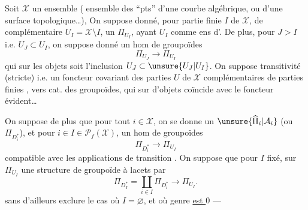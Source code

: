 Soit $\mathcal{X}$ un ensemble \inserted{$\ne\varnothing$}
( ensemble des
``pts'' d'une  courbe algébrique,
ou d'une surface topologique\ldots), 
 On suppose
donné, pour  partie finie $I$ de $\mathcal{X}$,
de complémentaire $U_I=\mathcal{X}\setminus I$, un
 $\Pi_{U_I}$, ayant $U_I$ comme ens
d'. De plus, pour $J>I$ i.e.
$U_J\subset U_I$, on suppose donné un hom
de groupoïdes
\[
\Pi_{U_J}\to\Pi_{U_I}
\]
qui sur les objets soit l'inclusion $U_J\subset\unsure{U_J|U_I}$.
On suppose transitivité (stricte) i.e. 
un foncteur covariant  des parties $U$ de
$\mathcal{X}$ complémentaires de parties finies , vers
 cat. des groupoïdes, qui sur 
d'objets coïncide avec le foncteur évident\ldots


On suppose de plus que pour tout 
$i\in\mathcal{X}$, on se donne un 
$\unsure{\widehat{\Pi}_i|\mathcal{A}_i}$ (ou $\Pi_{D_i^*}$),
et  pour $i\in I\in\mathcal{P}_f(\mathcal{X})$,
un hom de groupoïdes
\[
\Pi_{D_i^*}\to\Pi_{U_I}
\]
compatible avec les applications de transition
.
On suppose que pour $I$ fixé, 
sur $\Pi_{U_I}$ une structure de groupoïde
à lacets par
\[
\Pi_{D_I^*}=\coprod_{i\in I}\Pi_{D_i^*}\to\Pi_{U_I}.
\]
sans d'ailleurs exclure le cas où $I=\varnothing$, et où   genre \uline{est $0$} --- 

